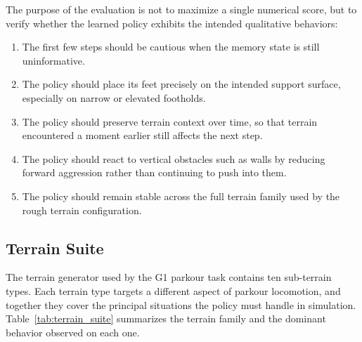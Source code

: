 The purpose of the evaluation is not to maximize a single numerical score, but to verify whether the learned policy exhibits the intended qualitative behaviors:
\begin{enumerate}
	\item The first few steps should be cautious when the memory state is still uninformative.
	\item The policy should place its feet precisely on the intended support surface, especially on narrow or elevated footholds.
	\item The policy should preserve terrain context over time, so that terrain encountered a moment earlier still affects the next step.
	\item The policy should react to vertical obstacles such as walls by reducing forward aggression rather than continuing to push into them.
	\item The policy should remain stable across the full terrain family used by the rough terrain configuration.
\end{enumerate}

\subsection{Terrain Suite}
\label{sec:terrain_suite}

The terrain generator used by the G1 parkour task contains ten sub-terrain types. Each terrain type targets a different aspect of parkour locomotion, and together they cover the principal situations the policy must handle in simulation. Table~\ref{tab:terrain_suite} summarizes the terrain family and the dominant behavior observed on each one.

